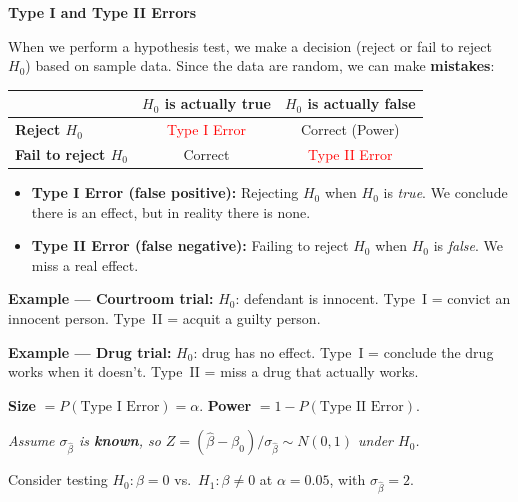 \documentclass[11pt,a4paper]{article}
\begin{document}
\begin{bookexample}
\textbf{\color{blockcolor}Type I and Type II Errors}

\smallskip
When we perform a hypothesis test, we make a decision (reject or fail to reject $H_0$) based on sample data. Since the data are random, we can make \textbf{mistakes}:

\medskip
\begin{center}
\renewcommand{\arraystretch}{1.4}
\begin{tabular}{l|cc}
 & \textbf{$H_0$ is actually true} & \textbf{$H_0$ is actually false} \\
\hline
\textbf{Reject $H_0$}      & \textcolor{red}{Type I Error}  & Correct (Power) \\
\textbf{Fail to reject $H_0$} & Correct              & \textcolor{red}{Type II Error} \\
\end{tabular}
\renewcommand{\arraystretch}{1.0}
\end{center}

\smallskip
\begin{itemize}[leftmargin=1.5em, itemsep=4pt]
  \item \textbf{Type I Error (false positive):} Rejecting $H_0$ when $H_0$ is \emph{true}. We conclude there is an effect, but in reality there is none.

  \item \textbf{Type II Error (false negative):} Failing to reject $H_0$ when $H_0$ is \emph{false}. We miss a real effect.
\end{itemize}

\medskip
\textbf{Example --- Courtroom trial:} $H_0$: defendant is innocent. Type~I = convict an innocent person. Type~II = acquit a guilty person.

\medskip
\textbf{Example --- Drug trial:} $H_0$: drug has no effect. Type~I = conclude the drug works when it doesn't. Type~II = miss a drug that actually works.

\medskip
\textbf{Size} $= P(\text{Type I Error}) = \alpha$. \quad \textbf{Power} $= 1 - P(\text{Type II Error})$.
\end{bookexample}

\medskip
\textit{Assume $\sigma_{\hat{\beta}}$ is \textbf{known}, so $Z = (\hat{\beta} - \beta_0)/\sigma_{\hat{\beta}} \sim N(0,1)$ under $H_0$.}

\medskip
Consider testing $H_0\colon \beta = 0$ vs.\ $H_1\colon \beta \ne 0$ at $\alpha = 0.05$, with $\sigma_{\hat{\beta}} = 2$.
\end{document}
